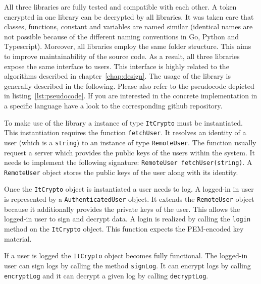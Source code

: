 \documentclass[../main.tex]{subfiles}
\begin{document}
All three libraries are fully tested and compatible with each other.
A token encrypted in one library can be decrypted by all libraries.
It was taken care that classes, functions, constant and variables are named similar (identical names are not possible because of the different naming conventions in Go, Python and Typescript).
Moreover, all libraries employ the same folder structure.
This aims to improve maintainability of the source code.
As a result, all three libraries expose the same interface to users.
This interface is highly related to the algorithms described in chapter~\ref{chap:design}.
The usage of the library is generally described in the following.
Please also refer to the pseudocode depicted in listing~\ref{lst:pseudocode}.
If you are interested in the concrete implementation in a specific language have a look to the corresponding github repository.

To make use of the library a instance of type \verb|ItCrypto| must be instantiated.
This instantiation requires the function \verb|fetchUser|.
It resolves an identity of a user (which is a \verb|string|) to an instance of type \verb|RemoteUser|.
The function usually request a server which provides the public keys of the users within the system.
It needs to implement the following signature: \verb|RemoteUser fetchUser(string)|.
A \verb|RemoteUser| object stores the public keys of the user along with its identity.

Once the \verb|ItCrypto| object is instantiated a user needs to log.
A logged-in in user is represented by a \verb|AuthenticatedUser| object.
It extends the \verb|RemoteUser| object because it additionally provides the private keys of the user.
This allows the logged-in user to sign and decrypt data.
A login is realized by calling the \verb|login| method on the \verb|ItCrypto| object.
This function expects the PEM-encoded key material.

If a user is logged the \verb|ItCrypto| object becomes fully functional.
The logged-in user can sign logs by calling the method \verb|signLog|.
It can encrypt logs by calling \verb|encryptLog| and it can decrypt a given log by calling \verb|decryptLog|.
\end{document}
